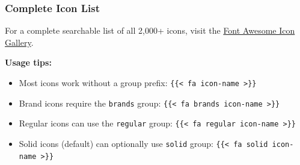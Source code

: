 \documentclass[
  letterpaper,
  DIV=11,
  numbers=noendperiod]{scrartcl}
\providecommand{\tightlist}{%
  \setlength{\itemsep}{0pt}\setlength{\parskip}{0pt}}
\begin{document}
\subsubsection{Complete Icon List}\label{complete-icon-list}

For a complete searchable list of all 2,000+ icons, visit the
\href{https://fontawesome.com/icons}{Font Awesome Icon Gallery}.

\textbf{Usage tips:}

\begin{itemize}
\tightlist
\item
  Most icons work without a group prefix:
  \texttt{\{\{\textless{}\ fa\ icon-name\ \textgreater{}\}\}}
\item
  Brand icons require the \texttt{brands} group:
  \texttt{\{\{\textless{}\ fa\ brands\ icon-name\ \textgreater{}\}\}}
\item
  Regular icons can use the \texttt{regular} group:
  \texttt{\{\{\textless{}\ fa\ regular\ icon-name\ \textgreater{}\}\}}
\item
  Solid icons (default) can optionally use \texttt{solid} group:
  \texttt{\{\{\textless{}\ fa\ solid\ icon-name\ \textgreater{}\}\}}
\end{itemize}
\end{document}
